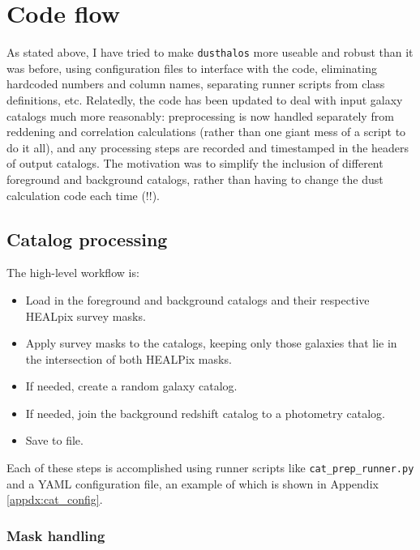 \documentclass[11pt, oneside]{article}   	%
\begin{document}



\section{Code flow}\label{sec:code}

As stated above, I have tried to make \texttt{dusthalos} more useable and robust than it was before, using configuration files to interface with the code, eliminating hardcoded numbers and column names, separating runner scripts from class definitions, etc. Relatedly, the code has been updated to deal with input galaxy catalogs much more reasonably: preprocessing is now handled separately from reddening and correlation calculations (rather than one giant mess of a script to do it all), and any processing steps are recorded and timestamped in the headers of output catalogs. The motivation was to simplify the inclusion of different foreground and background catalogs, rather than having to change the dust calculation code each time (!!).   


\subsection{Catalog processing}\label{sec:code:catalogs}
The high-level workflow is: 

 \begin{itemize}
    \item Load in the foreground and background catalogs and their 
    respective HEALpix survey masks.
    \item Apply survey masks to the catalogs, keeping only those galaxies that 
    lie in the intersection of both HEALPix masks. 
    \item If needed, create a random galaxy catalog. 
    \item If needed, join the background redshift catalog to a photometry catalog.
    \item Save to file.
 \end{itemize}
 
Each of these steps is accomplished using runner scripts like \texttt{cat\_prep\_runner.py} and a YAML configuration file, an example of which is shown in Appendix \ref{appdx:cat_config}.

\subsubsection{Mask handling}\label{sec:code:masks}
\end{document}
